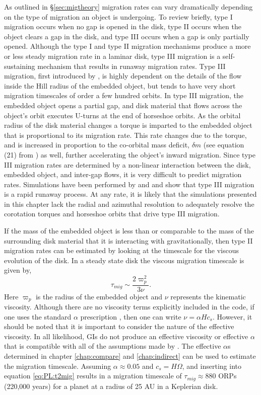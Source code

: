 As outlined in \S\ref{sec:migtheory} migration rates can vary dramatically depending on the type of migration an object is undergoing. To review briefly, type I migration occurs when no gap is opened in the disk, type II occurs when the object clears a gap in the disk, and type III occurs when a gap is only partially opened. Although the type I and type II migration mechanisms produce a more or less steady migration rate in a laminar disk, type III migration is a self-sustaining mechanism that results in runaway migration rates. Type III migration, first introduced by \citet{masset2003}, is highly dependent on the details of the flow inside the Hill radius of the embedded object, but tends to have very short migration timescales of order a few hundred orbits. In type III migration, the embedded object opens a partial gap, and disk material that flows across the object's orbit executes U-turns at the end of horseshoe orbits. As the orbital radius of the disk material changes a torque is imparted to the embedded object that is proportional to its migration rate. This rate changes due to the torque, and is increased in proportion to the co-orbital mass deficit, $\delta m$ (see equation (21) from \citet{masset2003}) as well, further accelerating the object's inward migration. Since type III migration rates are determined by a non-linear interaction between the disk, embedded object, and inter-gap flows, it is very difficult to predict migration rates. Simulations have been performed by \citet{lin2010} and \citet{peplinski2008a,peplinski2008b,peplinski2008c} and show that type III migration is a rapid runaway process. At any rate, it is likely that the simulations presented in this chapter lack the radial and azimuthal resolution to adequately resolve the corotation torques and horseshoe orbits that drive type III migration.

If the mass of the embedded object is less than or comparable to the mass of the surrounding disk material that it is interacting with gravitationally, then type II migration rates can be estimated by looking at the timescale for the viscous evolution of the disk. In a steady state disk the viscous migration timescale is given by,
\begin{equation}\label{eq:PL:t2mig}
\tau_{mig} \sim \frac{2 \varpi^2_p}{3 \nu}.
\end{equation}
Here $\varpi_p$ is the radius of the embedded object and $\nu$ represents the kinematic viscosity. Although there are no viscosity terms explicitly included in the code, if one uses the standard $\alpha$ prescription \citep{shakura1973}, then one can write $\nu = \alpha H c_s$. However, it should be noted that it is important to consider the nature of the effective viscosity. In all likelihood, GIs do not produce an effective viscosity or effective $\alpha$ that is compatible with all of the assumptions made by \citeauthor{shakura1973}. The effective $\alpha$s determined in chapter \ref{chap:compare} and \ref{chap:indirect} can be used to estimate the migration timescale. Assuming $\alpha \approx 0.05$ and $c_s = H\Omega$, and inserting into equation \eqref{eq:PL:t2mig} results in a migration timescale of $\tau_{mig} \approx 880$ ORPs (220,000 years) for a planet at a radius of 25 AU in a Keplerian disk.


